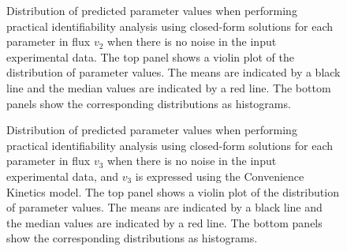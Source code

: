 \documentclass[10pt]{article}
\begin{document}
\begin{figure}[!tbhp]
	\caption{Distribution of predicted parameter values when performing practical identifiability analysis using closed-form solutions for each parameter in flux $v_2$ when there is no noise in the input experimental data. The top panel shows a violin plot of the distribution of parameter values. The means are indicated by a black line and the median values are indicated by a red line. The bottom panels show the corresponding distributions as histograms.}\label{fig:v2_ck_values}
\end{figure}

\begin{figure}[!tbhp]
	\caption{Distribution of predicted parameter values when performing practical identifiability analysis using closed-form solutions for each parameter in flux $v_3$ when there is no noise in the input experimental data, and $v_3$ is expressed using the Convenience Kinetics model. The top panel shows a violin plot of the distribution of parameter values. The means are indicated by a black line and the median values are indicated by a red line. The bottom panels show the corresponding distributions as histograms.}\label{fig:v3_ck_values}
\end{figure}
\end{document}
